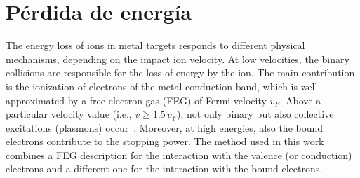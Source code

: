 \begin{comment}
Once the beam impinges on the Au/SiO$_2$ sample, protons are 
backscattered towards a Si surface barrier detector located at 
140$^{\circ}$ relative to the initial beam direction. Fig.~\ref{F01} 
shows two particle spectra, where the ion energies $E_2$ and $E_1$ are 
associated with a placed and removed hafnium sample, respectively. Both 
energy distributions were fitted by Gaussian functions to obtain the 
mean energy and width (FWHM) of the peaks \cite{Sun01}, and from the 
difference between these two peak positions in the spectrum, the total 
energy loss $\Delta E = (E_1 - E_2)$ in the foil was calculated. As 
established in previous studies \cite{Miranda01,Damache02}, the 
experimental stopping power cross sections $\varepsilon (E) $ are 
determined at some mean energy $E_{\mathrm{avg}}$ by measuring the ion 
energy losses $\Delta E$ within the investigated Hf foil, which has a 
mean thickness denoted by $\Delta x$. In this way, only when the energy 
loss fraction $\Delta E/E_{\mathrm{avg}}$ across the Hf foil is not 
exceeding 20\%, it is possible to define the stopping cross section by 
\cite{Raisanen01,Schulz01}:
\begin{equation}\label{eq:stcross}
 \varepsilon(E)=\frac{S(E)}{N}=-\frac{dE}{N\,dx}\approx-\frac{\Delta E}{N\Delta x},
\end{equation}
where $N$ denotes the atomic number density (atoms cm$^{-3}$) of the 
material under study. When this condition was not fulfilled, a small 
correction to the mean energies $E_{\mathrm{avg}}$ was applied in order 
to account for the non-linear dependence on ion energy of stopping powers 
\cite{Chilton,Rajatora}. The uncertainty ($\sim$ 0.7\%) in the measured energy 
loss $\Delta E$ of protons in the hafnium sample is mainly related to the 
statistical uncertainty found in the gaussian fits mentioned above. If this value 
is combined with the $\sim$ 4.9\% uncertainty in target thickness, then a 
$\sim$ 5.0\% uncertainty in the measured cross section is obtained.
\end{comment}

\section{Pérdida de energía} 
\label{sec:slpa+feg}

The energy loss of ions in metal targets responds to different physical 
mechanisms, depending on the impact ion velocity. At low velocities, the 
binary collisions are responsible for the loss of energy by the ion. 
The main contribution is the ionization of electrons of the metal 
conduction band, which is well approximated by a free electron gas (FEG) 
of Fermi velocity $v_F$. Above a particular velocity value (i.e., 
$v\geq 1.5\,v_F$), not only binary but also collective excitations 
(plasmons) occur~\cite{mon17}. Moreover, at high energies, also the 
bound electrons contribute to the stopping power. The method used in 
this work combines a FEG description for the interaction with the 
valence (or conduction) electrons and a different one for the 
interaction with the bound electrons.

